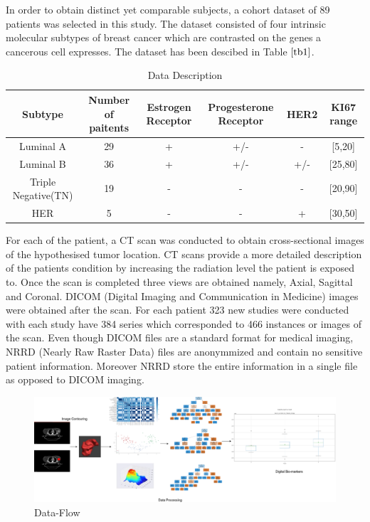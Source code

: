 \documentclass[10pt,journal,compsoc]{IEEEtran}
\begin{document}
In order to obtain distinct yet comparable subjects, a cohort dataset of 89 patients was selected in this study. The dataset consisted of four intrinsic molecular subtypes of breast cancer which are contrasted on the genes a cancerous cell expresses. The dataset has been descibed in Table $\ref{tb1}$.

\begin{table}[!b]
\scriptsize
\centering
\caption{Data Description}
\label{tb1}
\begin{tabular}{| c | c | c | c | c | c |}
\hline
\textbf{Subtype} & \textbf{Number of paitents} & \textbf{Estrogen Receptor} & \textbf{Progesterone Receptor} & \textbf{HER2} & \textbf{KI67 range}\\
\hline
Luminal A & 29 & + & +/- & - & [5,20] \\
Luminal B & 36 & + & +/- & +/- & [25,80] \\
Triple Negative(TN) & 19 & - & - & - & [20,90] \\
HER & 5 & - & - & + & [30,50]\\
\hline
\end{tabular}
\end{table}

For each of the patient, a CT scan was conducted to obtain cross-sectional images of the hypothesised tumor location. CT scans provide a more detailed description of the patients condition by increasing the radiation level the patient is exposed to. Once the scan is completed three views are obtained namely, Axial, Sagittal and Coronal. DICOM (Digital Imaging and Communication in Medicine) images were obtained after the scan. For each patient 323 new studies were conducted with each study have 384 series which corresponded to 466 instances or images of the scan. Even though DICOM files are a standard format for medical imaging, NRRD (Nearly Raw Raster Data) files are anonymmized and contain no sensitive patient information. Moreover NRRD store the entire information in a single file as opposed to DICOM imaging.



\begin{figure}[!b]
\centering
\includegraphics[width=7.5in]{im.png}
\caption{Data-Flow}
\label{img2}
\end{figure}
\end{document}
